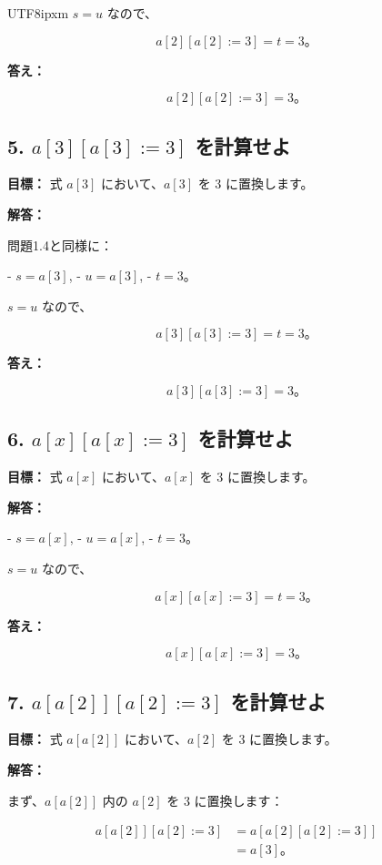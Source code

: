 \documentclass[12pt,a4paper]{article}
\begin{document}
\begin{CJK}{UTF8}{ipxm}
\( s = u \) なので、

\[
a[2][a[2] := 3] = t = 3。
\]

\textbf{答え：}

\[
a[2][a[2] := 3] = 3。
\]

\subsection*{5. \( a[3][a[3] := 3] \) を計算せよ}

\textbf{目標：} 式 \( a[3] \) において、\( a[3] \) を \( 3 \) に置換します。

\textbf{解答：}

問題1.4と同様に：

- \( s = a[3] \),
- \( u = a[3] \),
- \( t = 3 \)。

\( s = u \) なので、

\[
a[3][a[3] := 3] = t = 3。
\]

\textbf{答え：}

\[
a[3][a[3] := 3] = 3。
\]

\subsection*{6. \( a[x][a[x] := 3] \) を計算せよ}

\textbf{目標：} 式 \( a[x] \) において、\( a[x] \) を \( 3 \) に置換します。

\textbf{解答：}

- \( s = a[x] \),
- \( u = a[x] \),
- \( t = 3 \)。

\( s = u \) なので、

\[
a[x][a[x] := 3] = t = 3。
\]

\textbf{答え：}

\[
a[x][a[x] := 3] = 3。
\]

\subsection*{7. \( a[a[2]][a[2] := 3] \) を計算せよ}

\textbf{目標：} 式 \( a[a[2]] \) において、\( a[2] \) を \( 3 \) に置換します。

\textbf{解答：}

まず、\( a[a[2]] \) 内の \( a[2] \) を \( 3 \) に置換します：

\[
\begin{aligned}
a[a[2]][a[2] := 3] &= a[a[2][a[2] := 3]] \\
&= a[3]。
\end{aligned}
\]


\end{CJK}
\end{document}
